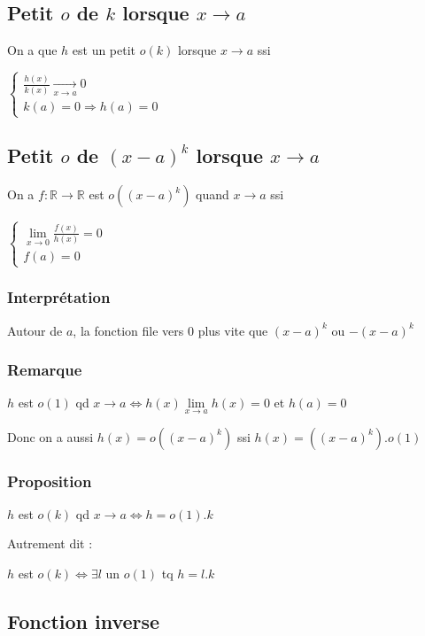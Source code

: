 \documentclass[a4paper,10pt]{article}
\newcommand{\ap}{\rightarrow}
\newcommand{\R}{\mathbb{R}}
\newcommand{\so}{\Rightarrow}
\newcommand{\ioi}{\Leftrightarrow}
\newcommand{\conv}[1]{\mathop{\longrightarrow}\limits_{#1}}
\newcommand{\clim}[1]{\lim\limits_{#1}}
\begin{document}
\subsection{Petit $o$ de $k$ lorsque $x \ap a$}

On a que $h$ est un petit $o(k)$ lorsque $x \ap a$ ssi 

$\begin{cases}
	\frac{h(x)}{k(x)} \conv{x \ap a} 0\\
	k(a) = 0 \so h(a)=0
\end{cases}$

\subsection{Petit $o$ de $(x-a)^k$ lorsque $x \ap a$}

On a $f: \R \ap \R$ est $o\left( \left( x-a \right)^k \right)$ quand $x \ap a$ ssi 

$\begin{cases}
	\clim{x \ap 0} \frac{f(x)}{h(x)} = 0\\
	f(a) = 0
\end{cases}$

\subsubsection{Interprétation}

Autour de $a$, la fonction file vers $0$ plus vite que $\left( x -a  \right)^k$ ou $-\left( x-a \right)^k$ 

\subsubsection{Remarque}

$h$ est $o(1)$ qd $x \ap a \ioi h(x) \clim{x \ap a} h(x) = 0$ et $h(a) = 0$

Donc on a aussi $h(x) = o\left( \left( x-a \right)^k \right)$ ssi $h(x) = \left( \left( x-a \right)^k \right).o(1)$

\subsubsection{Proposition}

$h$ est $o(k)$ qd $x \ap a \ioi h = o(1).k$

Autrement dit :

$h$ est $o(k) \ioi \exists l$ un $o(1)$ tq $h=l.k$

\subsection{Fonction inverse}
\end{document}
